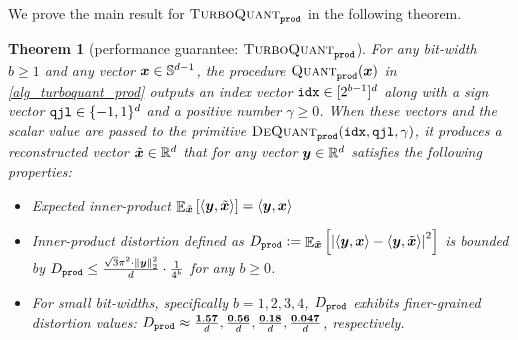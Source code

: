 \documentclass[11pt]{article}
\newtheorem{theorem}{Theorem}
\newcommand{\TurboQuant}{\textsc{TurboQuant}\xspace}
\begin{document}
We prove the main result for $\TurboQuant_{\tt prod}$ in the following theorem.
\begin{theorem}[performance guarantee: $\TurboQuant_{\tt prod}$] \label{thrm_prod}
For any bit-width $b \ge 1$ and any vector ${\bm x} \in \mathbb{S}^{d-1}$, the procedure $\textsc{Quant}_{\tt prod}({\bm x})$ in \cref{alg_turboquant_prod} outputs an index vector ${\tt idx} \in [2^{b-1}]^d$ along with a sign vector ${\tt qjl} \in \{ -1, 1 \}^d$ and a positive number $\gamma \ge 0$. 
When these vectors and the scalar value are passed to the primitive $\textsc{DeQuant}_{\tt prod}({\tt idx}, {\tt qjl}, \gamma)$, it produces a reconstructed vector $\tilde{{\bm x}} \in \mathbb{R}^d$ that for any vector ${\bm y} \in \mathbb{R}^d$ satisfies the following properties:
\begin{itemize}
    \item Expected inner-product $\mathop{{\mathbb{E}}}_{\tilde{{\bm x}}}\left[ \left< {\bm y}, \tilde{{\bm x}} \right> \right] = \langle {\bm y}, {\bm x} \rangle$
    \item Inner-product distortion defined as $D_{\tt prod} := \mathop{{\mathbb{E}}}_{\tilde{{\bm x}}}\left[\left| \langle {\bm y}, {\bm x} \rangle - \langle {\bm y}, \tilde{{\bm x}} \rangle \right|^2 \right]$ is bounded by $D_{\tt prod} \le \frac{\sqrt{3} \pi^2 \cdot \left\| {\bm y} \right\|_2^2}{d} \cdot \frac{1}{4^{b}}$ for any $b \ge 0$.
    \item For small bit-widths, specifically $b = 1, 2, 3, 4$, $D_{\tt prod}$ exhibits finer-grained distortion values: $D_{\tt prod} \approx \frac{\bf 1.57}{d}, \frac{\bf 0.56}{d}, \frac{\bf 0.18}{d}, \frac{\bf 0.047}{d}$, respectively.
\end{itemize}
\end{theorem}
\end{document}
